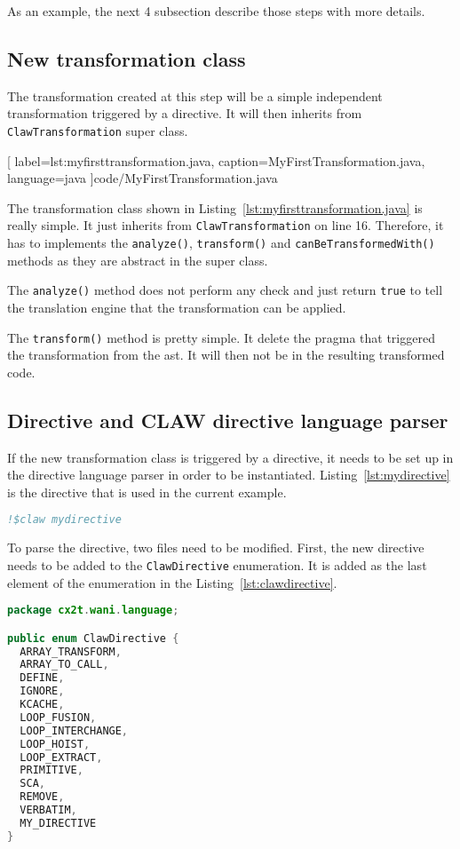 As an example, the next 4 subsection describe those steps with more details.

\subsection{New transformation class}
The transformation created at this step will be a simple independent
transformation triggered by a directive. It will then inherits from
\lstinline|ClawTransformation| super class.


  [
    label=lst:myfirsttransformation.java,
    caption=MyFirstTransformation.java,
    language=java
  ]{code/MyFirstTransformation.java}

The transformation class shown in Listing~\ref{lst:myfirsttransformation.java}
is really simple. It just inherits from \lstinline|ClawTransformation| on line
16. Therefore, it has to implements the \lstinline|analyze()|,
\lstinline|transform()| and \lstinline|canBeTransformedWith()| methods as they
are abstract in the super class.

The \lstinline|analyze()| method does not perform any check and just return
\lstinline|true| to tell the translation engine that the transformation can
be applied.

The \lstinline|transform()| method is pretty simple. It delete the pragma that
triggered the transformation from the \gls{ast}. It will then not be in the
resulting transformed code.

\subsection{Directive and CLAW directive language parser}
If the new transformation class is triggered by a directive, it needs to
be set up in the directive language parser in order to be instantiated.
Listing~\ref{lst:mydirective} is the directive that is used in
the current example.

\begin{lstlisting}[label=lst:mydirective, caption=Example directive,
  language=fortran]
!$claw mydirective
\end{lstlisting}

To parse the directive, two files need to be modified. First, the new directive
needs to be added to the \lstinline|ClawDirective| enumeration. It is added as
the last element of the enumeration in the Listing~\ref{lst:clawdirective}.

\begin{lstlisting}[label=lst:clawdirective, caption=ClawDirective.java,
  language=java]
package cx2t.wani.language;

public enum ClawDirective {
  ARRAY_TRANSFORM,
  ARRAY_TO_CALL,
  DEFINE,
  IGNORE,
  KCACHE,
  LOOP_FUSION,
  LOOP_INTERCHANGE,
  LOOP_HOIST,
  LOOP_EXTRACT,
  PRIMITIVE,
  SCA,
  REMOVE,
  VERBATIM,
  MY_DIRECTIVE
}
\end{lstlisting}

